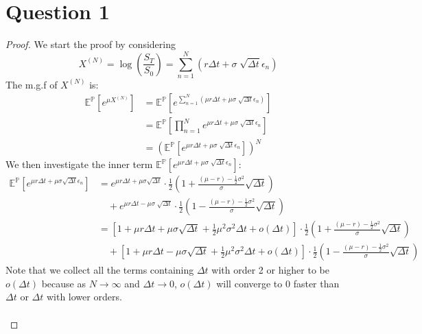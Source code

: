 \documentclass[12pt, letterpaper]{article}
\begin{document}
\part*{Question 1}
\begin{proof}
We start the proof by considering \[X^{(N)} = \log(\frac{S_T}{S_0}) = \sum_{n=1}^N (r\Delta t+\sigma \sqrt[]{\Delta t} \epsilon_n)\]
The m.g.f of $X^{(N)}$ is: \\
\begin{align*}
  \mathbb{E}^\mathbb{P}[e^{\mu X^{(N)}}] & =  \mathbb{E}^\mathbb{P}[e^{\sum_{n=1}^N (\mu r\Delta t+\mu\sigma \sqrt[]{\Delta t} \epsilon_n)}] \\
  & = \mathbb{E}^\mathbb{P} [\prod_{n=1}^N e^{\mu r\Delta t+\mu\sigma \sqrt[]{\Delta t} \epsilon_n}] \\
  & = (\mathbb{E}^\mathbb{P} [e^{\mu r\Delta t+\mu\sigma \sqrt[]{\Delta t} \epsilon_n}])^N \tag*{as $\epsilon_n$ is i.i.d}
\end{align*}
We then investigate the inner term $\mathbb{E}^\mathbb{P} [e^{\mu r\Delta t+\mu\sigma \sqrt[]{\Delta t} \epsilon_n}]$:
\begin{align*}
  \mathbb{E}^\mathbb{P} [e^{\mu r\Delta t+\mu\sigma \sqrt{\Delta t} \epsilon_n}] &= e^{\mu r\Delta t +\mu\sigma \sqrt{\Delta t}} \cdot \frac{1}{2} (1 + \frac{(\mu -r) - \frac{1}{2}\sigma^2}{\sigma} \sqrt{\Delta t}) \\ 
    & \quad + e^{\mu r\Delta t-\mu\sigma \sqrt[]{\Delta t}} \cdot \frac{1}{2} (1 - \frac{(\mu -r) - \frac{1}{2}\sigma^2}{\sigma} \sqrt{\Delta t}) \\
    &= [1+\mu r\Delta t+\mu \sigma \sqrt{\Delta t} +\frac{1}{2}\mu^2\sigma^2\Delta t + o(\Delta t)] \cdot \frac{1}{2} (1 + \frac{(\mu -r) - \frac{1}{2}\sigma^2}{\sigma} \sqrt{\Delta t}) \\ 
    & \quad + [1+\mu r\Delta t-\mu \sigma \sqrt{\Delta t} +\frac{1}{2}\mu^2\sigma^2\Delta t + o(\Delta t)] \cdot \frac{1}{2} (1 - \frac{(\mu -r) - \frac{1}{2}\sigma^2}{\sigma} \sqrt{\Delta t}) 
\end{align*}
Note that we collect all the terms containing $\Delta t$ with order 2 or higher to be $o(\Delta t)$ because as $N\rightarrow \infty$ 
and $\Delta t \rightarrow 0$, $o(\Delta t)$ will converge to 0 faster than $\Delta t$ or $\Delta t$ with lower orders.
\\ \\ 

\end{proof}
\end{document}
